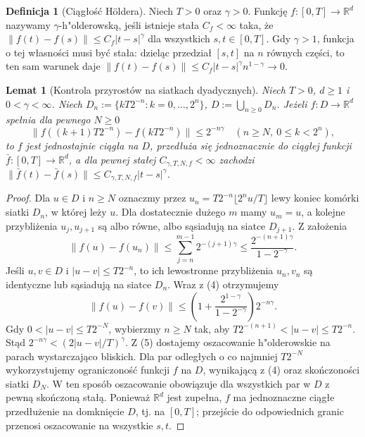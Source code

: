 \documentclass[11pt,a4paper,oneside]{report}
\numberwithin{equation}{chapter}
\theoremstyle{plain}
\newtheorem{lemat}[twierdzenie]{Lemat}
\theoremstyle{definition}
\newtheorem{definicja}{Definicja}[chapter]
\theoremstyle{remark}
\newcommand{\R}{\mathbb{R}}
\newcommand{\norm}[1]{\lVert #1\rVert}
\newcommand{\abs}[1]{\lvert #1\rvert}
\begin{document}
\begin{definicja}[Ciągłość Höldera]
Niech $T>0$ oraz $\gamma>0$.
Funkcję $f:[0,T]\to\R^d$ nazywamy $\gamma$-h"olderowską,
jeśli istnieje stała $C_f<\infty$ taka, że
$\norm{f(t)-f(s)}\le C_f\abs{t-s}^{\gamma}$
dla wszystkich $s,t\in[0,T]$.
Gdy $\gamma>1$, funkcja o tej własności musi być stała:
dzieląc przedział $[s,t]$ na $n$ równych części,
to ten sam warunek daje
$\norm{f(t)-f(s)}\le C_f\abs{t-s}^{\gamma}n^{1-\gamma}\to0$.
\end{definicja}

\begin{lemat}[Kontrola przyrostów na siatkach dyadycznych]
\label{lem:dyadyczny}
Niech $T>0$, $d\ge1$ i $0<\gamma<\infty$.
Niech $D_n:=\{kT2^{-n}:k=0,\ldots,2^n\}$,
$D:=\bigcup_{n\ge0}D_n$. Jeżeli $f:D\to\R^d$
spełnia dla pewnego $N\ge0$
\[
\norm{f((k+1)T2^{-n})-f(kT2^{-n})}
\le 2^{-n\gamma}
\quad(n\ge N,\ 0\le k<2^n),
\]
to $f$ jest jednostajnie ciągła na $D$,
przedłuża się jednoznacznie do ciągłej funkcji
$\bar f:[0,T]\to\R^d$, a dla pewnej stałej
$C_{\gamma,T,N,f}<\infty$ zachodzi
$\norm{\bar f(t)-\bar f(s)}\le C_{\gamma,T,N,f}|t-s|^\gamma$.
\end{lemat}
\begin{proof}
Dla $u\in D$ i $n\ge N$ oznaczmy przez
$u_n=T2^{-n}\lfloor 2^n u/T\rfloor$ lewy koniec
komórki siatki $D_n$, w której leży $u$.
Dla dostatecznie dużego $m$ mamy $u_m=u$,
a kolejne przybliżenia $u_j,u_{j+1}$ są albo równe,
albo sąsiadują na siatce $D_{j+1}$. Z założenia
\[
\norm{f(u)-f(u_n)}
\le\sum_{j=n}^{m-1}2^{-(j+1)\gamma}
\le\frac{2^{-(n+1)\gamma}}{1-2^{-\gamma}}.
\tag{4}
\]
Jeśli $u,v\in D$ i $\abs{u-v}\le T2^{-n}$,
to ich lewostronne przybliżenia $u_n,v_n$
są identyczne lub sąsiadują na siatce $D_n$.
Wraz z (4) otrzymujemy
\[
\norm{f(u)-f(v)}\le
\left(1+\frac{2^{1-\gamma}}{1-2^{-\gamma}}\right)
2^{-n\gamma}.
\tag{5}
\]
Gdy $0<\abs{u-v}\le T2^{-N}$, wybierzmy $n\ge N$
tak, aby $T2^{-(n+1)}<\abs{u-v}\le T2^{-n}$.
Stąd $2^{-n\gamma}<(2\abs{u-v}/T)^\gamma$.
Z (5) dostajemy oszacowanie h"olderowskie na parach
wystarczająco bliskich. Dla par odległych o co najmniej
$T2^{-N}$ wykorzystujemy ograniczoność funkcji $f$ na
$D$, wynikającą z (4) oraz skończoności siatki $D_N$.
W ten sposób oszacowanie obowiązuje dla wszystkich par
w $D$ z pewną skończoną stałą. Ponieważ $\R^d$ jest
zupełna, $f$ ma jednoznaczne ciągłe przedłużenie
na domknięcie $D$, tj. na $[0,T]$; przejście do
odpowiednich granic przenosi oszacowanie na wszystkie $s,t$.
\end{proof}
\end{document}
